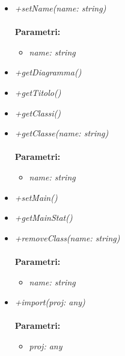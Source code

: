 \begin{itemize}
\begin{itemize}
\begin{itemize}
    		\end{itemize}
    		\item \emph{+setName(name: string)}\\
    		\\
    		\textbf{Parametri:}
    		\begin{itemize}
    			\item \emph{name: string}\\
    			
    		\end{itemize}
    		\item \emph{+getDiagramma()}\\
    		
    		\item \emph{+getTitolo()}\\
    		
    		\item \emph{+getClassi()}\\
    		
    		\item \emph{+getClasse(name: string)}\\
    		\\
    		\textbf{Parametri:}
    		\begin{itemize}
    			\item \emph{name: string}\\
    			
    		\end{itemize}
    		\item \emph{+setMain()}\\
    		
    		\item \emph{+getMainStat()}\\
    		
    		\item \emph{+removeClass(name: string)}\\
    		\\
    		\textbf{Parametri:}
    		\begin{itemize}
    			\item \emph{name: string}\\
    			
    		\end{itemize}
    		\item \emph{+import(proj: any)}\\
    		\\
    		\textbf{Parametri:}
    		\begin{itemize}
    			\item \emph{proj: any}\\
    			

\end{itemize}
\end{itemize}
\end{itemize}
